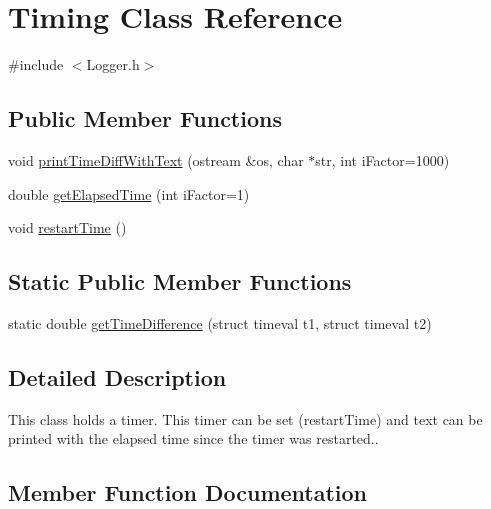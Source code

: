 \hypertarget{classTiming}{}\section{Timing Class Reference}
\label{classTiming}


{\ttfamily \#include $<$Logger.\+h$>$}

\subsection*{Public Member Functions}
\begin{DoxyCompactItemize}
\item 
void \hyperlink{classTiming_a6d15bb6b7407e89fd5e315bd84f3493f}{print\+Time\+Diff\+With\+Text} (ostream \&os, char $\ast$str, int i\+Factor=1000)
\item 
double \hyperlink{classTiming_a9745c4117778f1f6bdd4b43d50ae1248}{get\+Elapsed\+Time} (int i\+Factor=1)
\item 
void \hyperlink{classTiming_afd9d1489954f760ccfcbdd4742bcabf1}{restart\+Time} ()
\end{DoxyCompactItemize}
\subsection*{Static Public Member Functions}
\begin{DoxyCompactItemize}
\item 
static double \hyperlink{classTiming_abbd2aa42bdf82ec778c7da2d44bdc167}{get\+Time\+Difference} (struct timeval t1, struct timeval t2)
\end{DoxyCompactItemize}


\subsection{Detailed Description}
This class holds a timer. This timer can be set (restart\+Time) and text can be printed with the elapsed time since the timer was restarted.. 

\subsection{Member Function Documentation}

